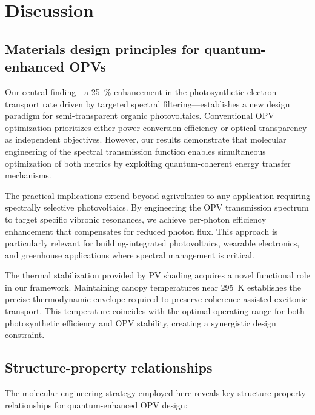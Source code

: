 
\section{Discussion}\label{sec:Discussion}

\subsection{Materials design principles for quantum-enhanced OPVs}

Our central finding---a \SI{25}{\percent} enhancement in the photosynthetic electron transport rate driven by targeted spectral filtering---establishes a new design paradigm for semi-transparent organic photovoltaics. Conventional OPV optimization prioritizes either power conversion efficiency or optical transparency as independent objectives. However, our results demonstrate that molecular engineering of the spectral transmission function enables simultaneous optimization of both metrics by exploiting quantum-coherent energy transfer mechanisms.

The practical implications extend beyond agrivoltaics to any application requiring spectrally selective photovoltaics. By engineering the OPV transmission spectrum to target specific vibronic resonances, we achieve per-photon efficiency enhancement that compensates for reduced photon flux. This approach is particularly relevant for building-integrated photovoltaics, wearable electronics, and greenhouse applications where spectral management is critical.

The thermal stabilization provided by PV shading acquires a novel functional role in our framework. Maintaining canopy temperatures near \SI{295}{\kelvin} establishes the precise thermodynamic envelope required to preserve coherence-assisted excitonic transport. This temperature coincides with the optimal operating range for both photosynthetic efficiency and OPV stability, creating a synergistic design constraint.

\subsection{Structure-property relationships}

The molecular engineering strategy employed here reveals key structure-property relationships for quantum-enhanced OPV design:


